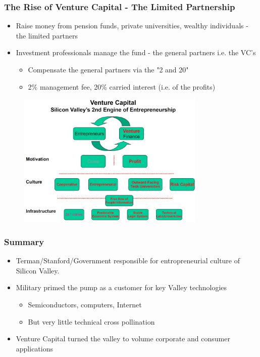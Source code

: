 \subsubsection{The Rise of Venture Capital - The Limited Partnership}

\begin{itemize}
    \item Raise money from pension funds, private universities, wealthy
        individuals - the limited partners
    \item Investment professionals manage the fund - the general partners i.e.
        the VC's
        \begin{itemize}
            \item Compensate the general partners via the "2 and 20"
            \item 2\% management fee, 20\% carried interest (i.e. of the
                profits)
        \end{itemize}
\end{itemize}

\begin{figure}[H]
    \centering
    \includegraphics[width=0.8\textwidth]{Pictures/Venture_capital_silicon_valley.png}
\end{figure}

\subsubsection{Summary}

\begin{itemize}
    \item Terman/Stanford/Government responsible for entropreneurial culture
        of Silicon Valley.
    \item Military primed the pump as a customer for key Valley technologies
        \begin{itemize}
            \item Semiconductors, computers, Internet
            \item But very little technical cross pollination
        \end{itemize}
    \item Venture Capital turned the valley to volume corporate and consumer
        applications
\end{itemize}

